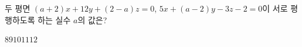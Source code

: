 두 평면 $(a+2)x+12y+(2-a)z=0$, $5x+(a-2)y-3z-2=0$이 서로 평행하도록 하는 실수 $a$의 값은?
\begin{choices32}{$8$}{$9$}{$10$}{$11$}{$12$}\end{choices32}
